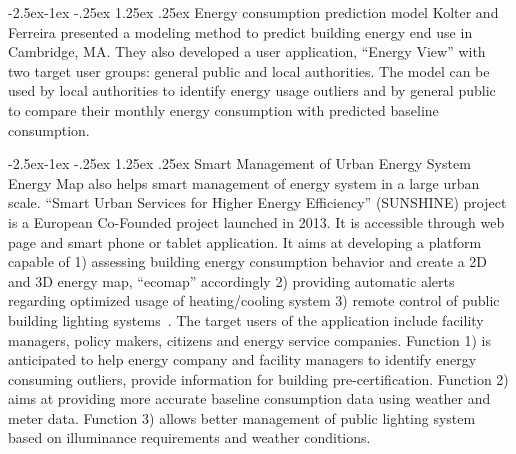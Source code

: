 \documentclass[hidelinks,12pt]{article}
\makeatletter
\renewcommand\paragraph{\@startsection{paragraph}{4}{\z@}%
            {-2.5ex\@plus -1ex \@minus -.25ex}%
            {1.25ex \@plus .25ex}%
            {\normalfont\normalsize\bfseries}}
\makeatother
\begin{document}
\paragraph{Energy consumption prediction model}
Kolter and Ferreira presented a modeling method to predict building
energy end use in Cambridge, MA. They also developed a user
application, ``Energy View'' with two target user groups: general
public and local authorities. The model can be used by local
authorities to identify energy usage outliers and by general public to
compare their monthly energy consumption with predicted baseline
consumption.

\paragraph{Smart Management of Urban Energy System}
Energy Map also helps smart management of energy system in a large
urban scale. ``Smart Urban Services for Higher Energy Efficiency''
(SUNSHINE) project is a European Co-Founded project launched in
2013. It is accessible through web page and smart phone or tablet
application. It aims at developing a platform capable of 1) assessing
building energy consumption behavior and create a 2D and 3D energy
map, ``ecomap'' accordingly 2) providing automatic alerts regarding
optimized usage of heating/cooling system 3) remote control of public
building lighting systems~\cite{SUNSHINE2015}. The target users of the
application include facility managers, policy makers, citizens and
energy service companies. Function 1) is anticipated to help energy
company and facility managers to identify energy consuming outliers,
provide information for building pre-certification. Function 2) aims
at providing more accurate baseline consumption data using weather and
meter data. Function 3) allows better management of public lighting
system based on illuminance requirements and weather conditions.
\end{document}
